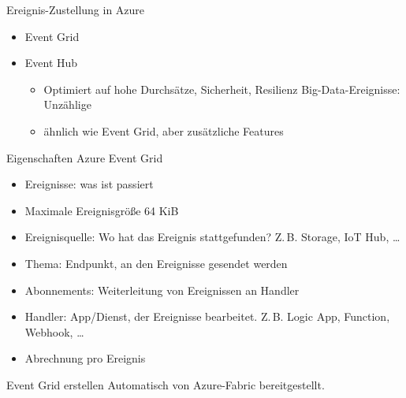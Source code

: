 \begin{flashcard}[Definition]{Ereignis-Zustellung in Azure}
    \begin{itemize}
        \item Event Grid
        \item Event Hub
            \begin{itemize}
                \item Optimiert auf hohe Durchsätze, Sicherheit, Resilienz\newline
                    Big-Data-Ereignisse: Unzählige
                \item ähnlich wie Event Grid, aber zusätzliche Features
            \end{itemize}
    \end{itemize}
\end{flashcard}

\begin{flashcard}[Definition]{Eigenschaften Azure Event Grid}
    \begin{itemize}
        \item Ereignisse: was ist passiert
        \item Maximale Ereignisgröße 64 KiB
        \item Ereignisquelle: Wo hat das Ereignis stattgefunden?\newline
            Z.\,B. Storage, IoT Hub, \ldots
        \item Thema: Endpunkt, an den Ereignisse gesendet werden
        \item Abonnements: Weiterleitung von Ereignissen an Handler
        \item Handler: App/Dienst, der Ereignisse bearbeitet.\newline
            Z.\,B. Logic App, Function, Webhook, \ldots
        \item Abrechnung pro Ereignis
    \end{itemize}
\end{flashcard}

\begin{flashcard}[Definition]{Event Grid erstellen}
    Automatisch von Azure-Fabric bereitgestellt.
\end{flashcard}

